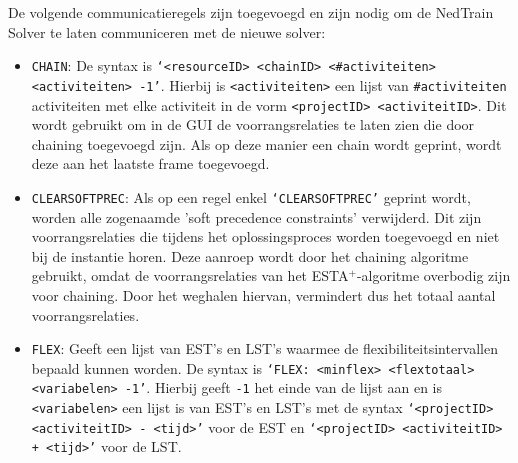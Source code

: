 De volgende communicatieregels zijn toegevoegd en zijn nodig om de NedTrain Solver te laten communiceren met de nieuwe solver:
\begin{itemize}
    \item \texttt{CHAIN}: De syntax is \texttt{\textquoteleft <resourceID> <chainID> <\#activiteiten> <activiteiten> -1\textquoteright}. Hierbij is \texttt{<activiteiten>} een lijst van \texttt{\#activiteiten} activiteiten met elke activiteit in de vorm \texttt{<projectID> <activiteitID>}. Dit wordt gebruikt om in de GUI de voorrangsrelaties te laten zien die door chaining toegevoegd zijn. Als op deze manier een chain wordt geprint, wordt deze aan het laatste frame toegevoegd.
    \item \texttt{CLEARSOFTPREC}: Als op een regel enkel \texttt{\textquoteleft CLEARSOFTPREC\textquoteright} geprint wordt, worden alle zogenaamde 'soft precedence constraints' verwijderd. Dit zijn voorrangsrelaties die tijdens het oplossingsproces worden toegevoegd en niet bij de instantie horen. Deze aanroep wordt door het chaining algoritme gebruikt, omdat de voorrangsrelaties van het ESTA$^+$-algoritme overbodig zijn voor chaining. Door het weghalen hiervan, vermindert dus het totaal aantal voorrangsrelaties.
    \item \texttt{FLEX}: Geeft een lijst van EST's en LST's waarmee de flexibiliteitsintervallen bepaald kunnen worden. De syntax is \texttt{\textquoteleft FLEX: <minflex> <flextotaal> <variabelen> -1\textquoteright}. Hierbij geeft \texttt{-1} het einde van de lijst aan en is \texttt{<variabelen>} een lijst is van EST's en LST's met de syntax \texttt{\textquoteleft <projectID> <activiteitID> - <tijd>\textquoteright} voor de EST en \texttt{\textquoteleft <projectID> <activiteitID> + <tijd>\textquoteright} voor de LST.
\end{itemize}
